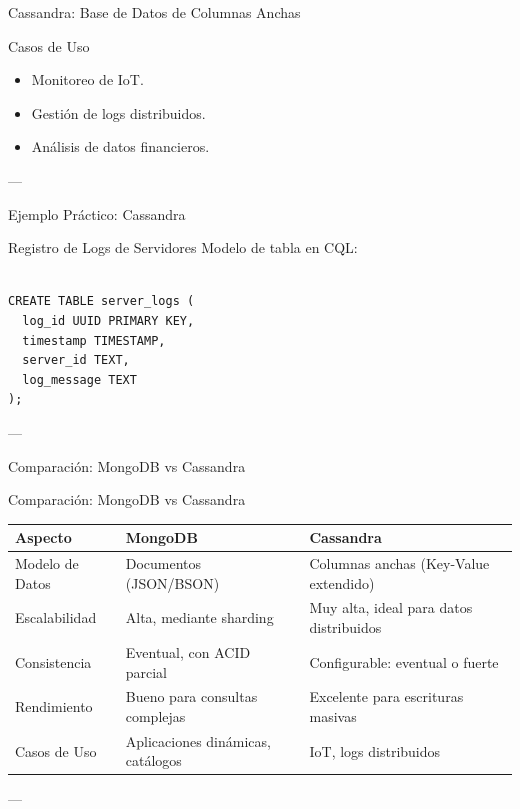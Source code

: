 \documentclass[presentation]{beamer}
\begin{document}
\begin{frame}[label={sec:org43493f4}]{Cassandra: Base de Datos de Columnas Anchas}
\begin{block}{Casos de Uso}
\begin{itemize}
\item Monitoreo de IoT.
\item Gestión de logs distribuidos.
\item Análisis de datos financieros.
\end{itemize}

---
\end{block}
\end{frame}

\begin{frame}[label={sec:org6219490},fragile]{Ejemplo Práctico: Cassandra}
 \begin{block}{Registro de Logs de Servidores}
Modelo de tabla en CQL:
\begin{verbatim}

CREATE TABLE server_logs (
  log_id UUID PRIMARY KEY,
  timestamp TIMESTAMP,
  server_id TEXT,
  log_message TEXT
);
\end{verbatim}

---
\end{block}
\end{frame}

\begin{frame}[label={sec:orgda32e5c}]{Comparación: MongoDB vs Cassandra}
\end{frame}
\begin{frame}[label={sec:orga2733ac}]{Comparación: MongoDB vs Cassandra}
\begin{center}
\begin{tabular}{lll}
\alert{\alert{Aspecto}} & \alert{\alert{MongoDB}} & \alert{\alert{Cassandra}}\\[0pt]
\hline
Modelo de Datos & Documentos (JSON/BSON) & Columnas anchas (Key-Value extendido)\\[0pt]
Escalabilidad & Alta, mediante sharding & Muy alta, ideal para datos distribuidos\\[0pt]
Consistencia & Eventual, con ACID parcial & Configurable: eventual o fuerte\\[0pt]
Rendimiento & Bueno para consultas complejas & Excelente para escrituras masivas\\[0pt]
Casos de Uso & Aplicaciones dinámicas, catálogos & IoT, logs distribuidos\\[0pt]
\end{tabular}
\end{center}

---
\end{frame}
\end{document}
